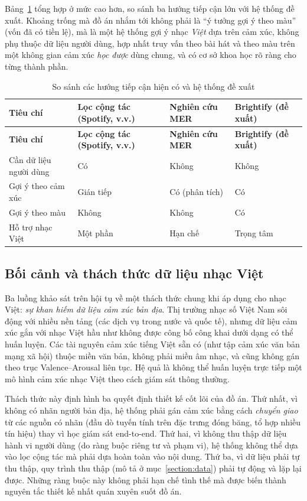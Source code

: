 \documentclass[../DoAn.tex]{subfiles}
\begin{document}
Bảng~\ref{table:khaosat} tổng hợp ở mức cao hơn, so sánh ba hướng tiếp cận lớn với hệ thống đề xuất. Khoảng trống mà đồ án nhắm tới không phải là ``ý tưởng gợi ý theo màu'' (vốn đã có tiền lệ), mà là một hệ thống gợi ý nhạc \textit{Việt} dựa trên cảm xúc, không phụ thuộc dữ liệu người dùng, hợp nhất truy vấn theo bài hát và theo màu trên một không gian cảm xúc \textit{học được} dùng chung, và có cơ sở khoa học rõ ràng cho từng thành phần.

\begin{longtable}{|p{3.2cm}|p{2.6cm}|p{2.4cm}|p{3.2cm}|}
\caption{So sánh các hướng tiếp cận hiện có và hệ thống đề xuất}\label{table:khaosat}\\
\hline
\textbf{Tiêu chí} & \textbf{Lọc cộng tác (Spotify, v.v.)} & \textbf{Nghiên cứu MER} & \textbf{Brightify (đề xuất)} \\
\hline
\endfirsthead
\hline
\textbf{Tiêu chí} & \textbf{Lọc cộng tác (Spotify, v.v.)} & \textbf{Nghiên cứu MER} & \textbf{Brightify (đề xuất)} \\
\hline
\endhead
Cần dữ liệu người dùng & Có & Không & Không \\
\hline
Gợi ý theo cảm xúc & Gián tiếp & Có (phân tích) & Có \\
\hline
Gợi ý theo màu & Không & Không & Có \\
\hline
Hỗ trợ nhạc Việt & Một phần & Hạn chế & Trọng tâm \\
\hline
\end{longtable}

\subsection{Bối cảnh và thách thức dữ liệu nhạc Việt}
\label{subsection:2.1.4}
Ba luồng khảo sát trên hội tụ về một thách thức chung khi áp dụng cho nhạc Việt: \textit{sự khan hiếm dữ liệu cảm xúc bản địa}. Thị trường nhạc số Việt Nam sôi động với nhiều nền tảng (các dịch vụ trong nước và quốc tế), nhưng dữ liệu cảm xúc gắn với nhạc Việt hầu như không được công bố công khai dưới dạng có thể huấn luyện. Các tài nguyên cảm xúc tiếng Việt sẵn có (như tập cảm xúc văn bản mạng xã hội) thuộc miền văn bản, không phải miền âm nhạc, và cũng không gán theo trục Valence--Arousal liên tục. Hệ quả là không thể huấn luyện trực tiếp một mô hình cảm xúc nhạc Việt theo cách giám sát thông thường.

Thách thức này định hình ba quyết định thiết kế cốt lõi của đồ án. Thứ nhất, vì không có nhãn người bản địa, hệ thống phải gán cảm xúc bằng cách \textit{chuyển giao} từ các nguồn có nhãn (đầu dò tuyến tính trên đặc trưng đóng băng, tổ hợp nhiều tín hiệu) thay vì học giám sát end-to-end. Thứ hai, vì không thu thập dữ liệu hành vi người dùng (do ràng buộc riêng tư và phạm vi), hệ thống không thể dựa vào lọc cộng tác mà phải dựa hoàn toàn vào nội dung. Thứ ba, vì dữ liệu phải tự thu thập, quy trình thu thập (mô tả ở mục~\ref{section:data}) phải tự động và lặp lại được. Những ràng buộc này không phải hạn chế tình thế mà được biến thành nguyên tắc thiết kế nhất quán xuyên suốt đồ án.
\end{document}
